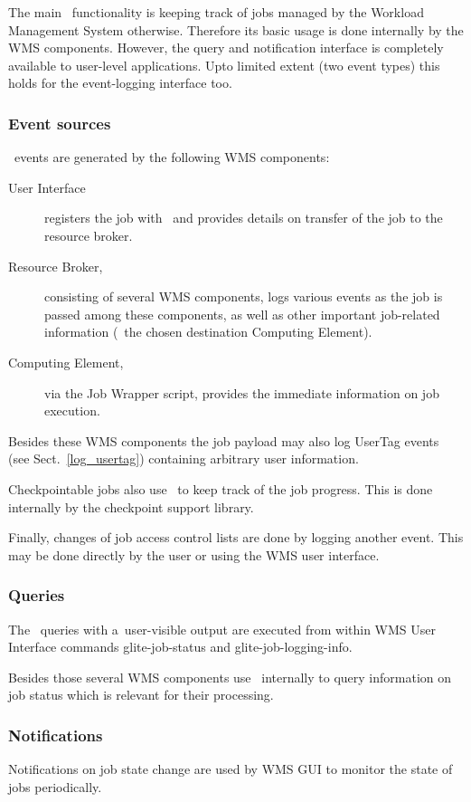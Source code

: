 The main \LB\ functionality is keeping track of jobs managed by
the Workload Management System otherwise.
Therefore its basic usage is done internally by the WMS components.
However, the query and notification interface is completely available
to user-level applications. Upto limited extent (two event types)
this holds for the event-logging interface too.

\subsubsection{Event sources}
\LB\ events are generated by the following WMS components:
\begin{description}
\item[User Interface] registers the job with \LB\ and provides details
on transfer of the job to the resource broker.
\item[Resource Broker,] consisting of several WMS components,
logs various events as the job is passed among these components, 
as well as other important job-related information (\eg\ the chosen
destination Computing Element).
\item[Computing Element,] via the Job Wrapper script, provides the immediate
information on job execution.
\end{description}
Besides these WMS components the job payload may also log UserTag events
(see Sect.~\ref{log_usertag}) containing arbitrary user information.

Checkpointable jobs also use \LB\ to keep track of the job progress.
This is done internally by the checkpoint support library.

Finally, changes of job access control lists are done by logging
another event. This may be done directly by the user or using the WMS
user interface.

\subsubsection{Queries}

The \LB\ queries with a~user-visible output
are executed from within WMS User Interface
commands glite-job-status and glite-job-logging-info.

Besides those several WMS components use \LB\ internally to query
information on job status which is relevant for their processing.

\subsubsection{Notifications}

Notifications on job state change are used by WMS GUI 
to monitor the state of jobs periodically.


